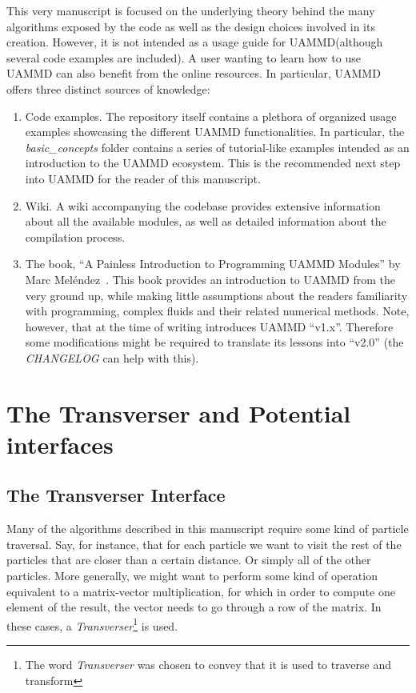 \documentclass[ twoside,openright,titlepage,numbers=noenddot,%
headinclude,footinclude,cleardoublepage=empty,abstract=on,
BCOR=5mm,paper=b5,fontsize=11pt, dvipsnames
]{scrreprt}
\newcommand{\uammd}{\gls{UAMMD}\xspace}
\begin{document}
This very manuscript is focused on the underlying theory behind the many algorithms exposed by the code as well as the design choices involved in its creation. However, it is not intended as a usage guide for \uammd (although several code examples are included). A user wanting to learn how to use \uammd can also benefit from the online resources. In particular, \uammd offers three distinct sources of knowledge:
\begin{enumerate}
\item Code examples.
  The repository itself contains a plethora of organized usage examples showcasing the different \uammd functionalities. In particular, the \emph{basic\_concepts} folder contains a series of tutorial-like examples intended as an introduction to the \uammd ecosystem. This is the recommended next step into UAMMD for the reader of this manuscript.
\item Wiki.
  A wiki accompanying the codebase provides extensive information about all the available modules, as well as detailed information about the compilation process.
\item The book, ``A Painless Introduction to Programming UAMMD Modules'' by Marc Meléndez~\cite{Marc2020}.
  This book provides an introduction to \uammd from the very ground up, while making little assumptions about the readers familiarity with programming, complex fluids and their related numerical methods. Note, however, that at the time of writing \cite{Marc2020} introduces UAMMD ``v1.x''. Therefore some modifications might be required to translate its lessons into ``v2.0'' (the \emph{CHANGELOG} can help with this).
\end{enumerate}

\chapter{The Transverser and Potential interfaces}\label{ch:transverser}

\section{The Transverser Interface} \label{sec:transverser}

Many of the algorithms described in this manuscript require some kind of particle traversal.
Say, for instance, that for each particle we want to visit the rest of the particles that are closer than a certain distance. Or simply all of the other particles. More generally, we might want to perform some kind of operation equivalent to a matrix-vector multiplication, for which in order to compute one element of the result, the vector needs to go through a row of the matrix.
In these cases, a \emph{Transverser}\footnote{The word \emph{Transverser} was chosen to convey that it is used to traverse and transform} is used.
\end{document}
